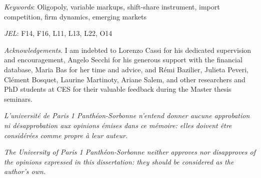\documentclass[12pt]{article}
\begin{document}
\begin{titlepage}
\begin{center}
\begin{minipage}{0.94\textwidth}
\smallskip
\textit{Keywords}: Oligopoly, variable markups, shift-share instrument, import competition, firm dynamics, emerging markets

\smallskip
\textit{JEL}: F14, F16, L11, L13, L22, O14
\end{minipage}
\end{center}
\endgroup

\vspace{0.3cm}

\begingroup
\footnotesize
{}
\noindent\hspace*{0.04\textwidth}\begin{minipage}{0.92\textwidth}
\textit{Acknowledgements}. I am indebted to Lorenzo Cassi for his dedicated supervision and encouragement, Angelo Secchi for his generous support with the financial database, Maria Bas for her time and advice, and R\'{e}mi Bazilier, Julieta Peveri, Cl\'{e}ment Bosquet, Laurine Martinoty, Ariane Salem, and other researchers and PhD students at CES for their valuable feedback during the Master thesis seminars.
\end{minipage}
\endgroup
\end{titlepage}

\newpage
\thispagestyle{empty}
\begin{center}
\bigskip\vspace*{6in}

\textit{L'universit\'{e} de Paris 1 Panth\'{e}on-Sorbonne n'entend donner aucune approbation
ni d\'{e}sapprobation aux opinions \'{e}mises dans ce m\'{e}moire: elles doivent \^{e}tre consid\'{e}r\'{e}es comme propre \`{a} leur auteur.}

\bigskip\vspace*{0.25in}

\textit{The University of Paris 1 Panth\'{e}on-Sorbonne neither approves nor
disapproves of the opinions expressed in this dissertation: they should be
considered as the author's own.}
\end{center}

\pagebreak%
\tableofcontents
\pagebreak%
\onehalfspacing
\end{document}
